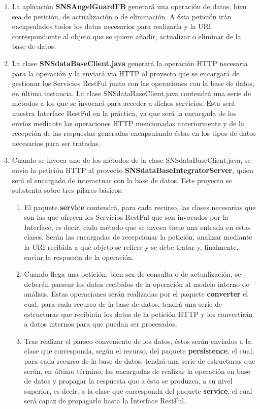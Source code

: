 \begin{enumerate}
\item La aplicación \textbf{SNSAngelGuardFB} generará una operación de datos, bien sea de petición, de actualización o de eliminación. A ésta petición irán encapsulados todos los datos necesarios para realizarla y la URI correspondiente al objeto que se quiere añadir, actualizar o eliminar de la base de datos.
\item La clase \textbf{SNSdataBaseClient.java} generará la operación HTTP necesaria para la operación y la enviará via HTTP al proyecto que se encargará de gestionar los Servicios RestFul junto con las operaciones con la base de datos, en última instancia. La clase SNSdataBaseClient.java contendrá una serie de métodos a los que se invocará para acceder a dichos servicios. Esta será nuestra Interface RestFul en la práctica, ya que será la encargada de los envíos mediante las operaciones HTTP mencionadas anteriormente y de la recepción de las respuestas generadas encapsulando éstas en los tipos de datos necesarios para ser tratadas.
\item Cuando se invoca uno de los métodos de la clase SNSdataBaseClient.java, se envia la petición HTTP al proyecto \textbf{SNSdataBaseIntegratorServer}, quien será el encargado de interactuar con la base de datos. Este proyecto se substenta sobre tres pilares básicos:
\begin{enumerate}
\item El paquete \textbf{service} contendrá, para cada recurso, las clases necesarias que son las que ofrecen los Servicios RestFul que son invocados por la Interface, es decir, cada método que se invoca tiene una entrada en estas clases. Serán las encargadas de recepcionar la petición, analizar mediante la URI recibida a qué objeto se refiere y se debe tratar y, finalmente, enviar la respuesta de la operación.
\item Cuando llega una petición, bien sea de consulta o de actualización, se deberán parsear los datos recibidos de la operación al modelo interno de análisis. Estas operaciones serán realizadas por el paquete \textbf{converter} el cual, para cada recurso de la base de datos, tendrá una serie de estructuras que recibirán los datos de la petición HTTP y los convertirán a datos internos para que puedan ser procesados.
\item Tras realizar el parseo conveniente de los datos, éstos serán enviados a la clase que corresponda, según el recurso, del paquete \textbf{persistence}, el cual, para cada recurso de la base de datos, tendrá una serie de estructuras que serán, en último término, las encargadas de realizar la operación en base de datos y propagar la respuesta que a ésta se produzca, a su nivel superior, es decir, a la clase que corresponda del paquete \textbf{service}, el cual será capaz de propagarlo hasta la Interface RestFul.

\end{enumerate}
\end{enumerate}
